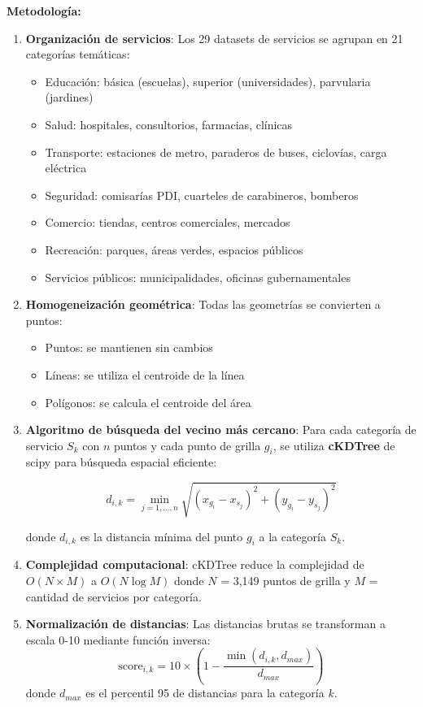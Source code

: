 \textbf{Metodología:}
\begin{enumerate}
    \item \textbf{Organización de servicios}: Los 29 datasets de servicios se agrupan en 21 categorías temáticas:
    \begin{itemize}
        \item Educación: básica (escuelas), superior (universidades), parvularia (jardines)
        \item Salud: hospitales, consultorios, farmacias, clínicas
        \item Transporte: estaciones de metro, paraderos de buses, ciclovías, carga eléctrica
        \item Seguridad: comisarías PDI, cuarteles de carabineros, bomberos
        \item Comercio: tiendas, centros comerciales, mercados
        \item Recreación: parques, áreas verdes, espacios públicos
        \item Servicios públicos: municipalidades, oficinas gubernamentales
    \end{itemize}
    
    \item \textbf{Homogeneización geométrica}: Todas las geometrías se convierten a puntos:
    \begin{itemize}
        \item Puntos: se mantienen sin cambios
        \item Líneas: se utiliza el centroide de la línea
        \item Polígonos: se calcula el centroide del área
    \end{itemize}
    
    \item \textbf{Algoritmo de búsqueda del vecino más cercano}: Para cada categoría de servicio $S_k$ con $n$ puntos y cada punto de grilla $g_i$, se utiliza \textbf{cKDTree} de scipy para búsqueda espacial eficiente:
    
    \begin{equation}
    d_{i,k} = \min_{j=1,\ldots,n} \sqrt{(x_{g_i} - x_{s_j})^2 + (y_{g_i} - y_{s_j})^2}
    \end{equation}
    
    donde $d_{i,k}$ es la distancia mínima del punto $g_i$ a la categoría $S_k$.
    
    \item \textbf{Complejidad computacional}: cKDTree reduce la complejidad de $O(N \times M)$ a $O(N \log M)$ donde $N$ = 3,149 puntos de grilla y $M$ = cantidad de servicios por categoría.
    
    \item \textbf{Normalización de distancias}: Las distancias brutas se transforman a escala 0-10 mediante función inversa:
    \begin{equation}
    \text{score}_{i,k} = 10 \times \left(1 - \frac{\min(d_{i,k}, d_{max})}{d_{max}}\right)
    \end{equation}
    donde $d_{max}$ es el percentil 95 de distancias para la categoría $k$.
\end{enumerate}

